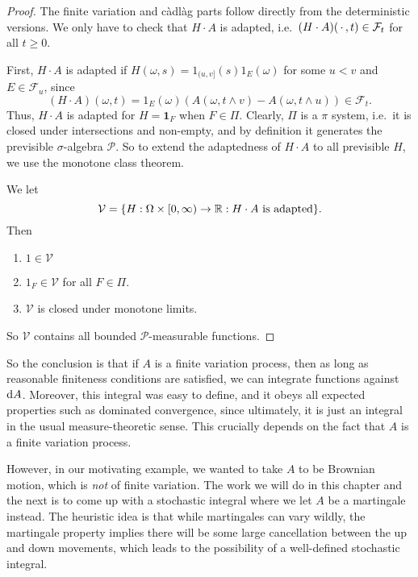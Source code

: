 \documentclass[a4paper]{article}
\begin{document}
\begin{proof}
  The finite variation and c\`adl\`ag parts follow directly from the deterministic versions. We only have to check that $H \cdot A$ is adapted, i.e.\ $(H \cdot A)(\,\cdot\,, t) \in \mathcal{F}_t$ for all $t \geq 0$.

  First, $H \cdot A$ is adapted if $H(\omega, s) = 1_{(u, v]}(s) 1_E(\omega)$ for some $u < v$ and $E \in \mathcal{F}_u$, since
  \[
    (H \cdot A)(\omega, t) = 1_E(\omega) (A(\omega, t \wedge v) - A(\omega, t \wedge u)) \in \mathcal{F}_t.
  \]
  Thus, $H \cdot A$ is adapted for $H = \mathbf{1}_F$ when $F \in \Pi$. Clearly, $\Pi$ is a $\pi$ system, i.e.\ it is closed under intersections and non-empty, and by definition it generates the previsible $\sigma$-algebra $\mathcal{P}$. So to extend the adaptedness of $H \cdot A$ to all previsible $H$, we use the monotone class theorem.

  We let
  \[
    \mathcal{V} = \{H: \Omega \times [0, \infty) \to \mathbb{R}: H \cdot A\text{ is adapted}\}.
  \]
  Then
  \begin{enumerate}
    \item $1 \in \mathcal{V}$
    \item $1_F \in \mathcal{V}$ for all $F \in \Pi$.
    \item $\mathcal{V}$ is closed under monotone limits.
  \end{enumerate}
  So $\mathcal{V}$ contains all bounded $\mathcal{P}$-measurable functions.
\end{proof}

So the conclusion is that if $A$ is a finite variation process, then as long as reasonable finiteness conditions are satisfied, we can integrate functions against $\mathrm{d} A$. Moreover, this integral was easy to define, and it obeys all expected properties such as dominated convergence, since ultimately, it is just an integral in the usual measure-theoretic sense. This crucially depends on the fact that $A$ is a finite variation process.

However, in our motivating example, we wanted to take $A$ to be Brownian motion, which is \emph{not} of finite variation. The work we will do in this chapter and the next is to come up with a stochastic integral where we let $A$ be a martingale instead. The heuristic idea is that while martingales can vary wildly, the martingale property implies there will be some large cancellation between the up and down movements, which leads to the possibility of a well-defined stochastic integral.
\end{document}
